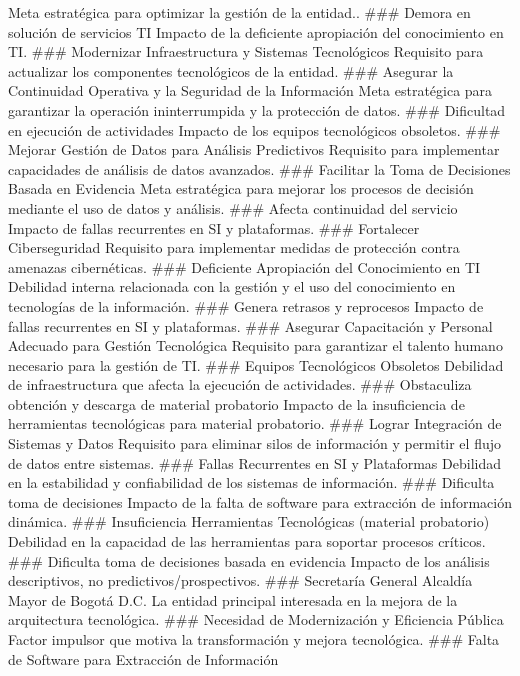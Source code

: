 \documentclass[
	a4paper, %
	12pt, %
]{include/CSSullivanBusinessReport}
\begin{document}
Meta estratégica para optimizar la gestión de la entidad.. \#\#\# Demora
en solución de servicios TI Impacto de la deficiente apropiación del
conocimiento en TI. \#\#\# Modernizar Infraestructura y Sistemas
Tecnológicos Requisito para actualizar los componentes tecnológicos de
la entidad. \#\#\# Asegurar la Continuidad Operativa y la Seguridad de
la Información Meta estratégica para garantizar la operación
ininterrumpida y la protección de datos. \#\#\# Dificultad en ejecución
de actividades Impacto de los equipos tecnológicos obsoletos. \#\#\#
Mejorar Gestión de Datos para Análisis Predictivos Requisito para
implementar capacidades de análisis de datos avanzados. \#\#\# Facilitar
la Toma de Decisiones Basada en Evidencia Meta estratégica para mejorar
los procesos de decisión mediante el uso de datos y análisis. \#\#\#
Afecta continuidad del servicio Impacto de fallas recurrentes en SI y
plataformas. \#\#\# Fortalecer Ciberseguridad Requisito para implementar
medidas de protección contra amenazas cibernéticas. \#\#\# Deficiente
Apropiación del Conocimiento en TI Debilidad interna relacionada con la
gestión y el uso del conocimiento en tecnologías de la información.
\#\#\# Genera retrasos y reprocesos Impacto de fallas recurrentes en SI
y plataformas. \#\#\# Asegurar Capacitación y Personal Adecuado para
Gestión Tecnológica Requisito para garantizar el talento humano
necesario para la gestión de TI. \#\#\# Equipos Tecnológicos Obsoletos
Debilidad de infraestructura que afecta la ejecución de actividades.
\#\#\# Obstaculiza obtención y descarga de material probatorio Impacto
de la insuficiencia de herramientas tecnológicas para material
probatorio. \#\#\# Lograr Integración de Sistemas y Datos Requisito para
eliminar silos de información y permitir el flujo de datos entre
sistemas. \#\#\# Fallas Recurrentes en SI y Plataformas Debilidad en la
estabilidad y confiabilidad de los sistemas de información. \#\#\#
Dificulta toma de decisiones Impacto de la falta de software para
extracción de información dinámica. \#\#\# Insuficiencia Herramientas
Tecnológicas (material probatorio) Debilidad en la capacidad de las
herramientas para soportar procesos críticos. \#\#\# Dificulta toma de
decisiones basada en evidencia Impacto de los análisis descriptivos, no
predictivos/prospectivos. \#\#\# Secretaría General Alcaldía Mayor de
Bogotá D.C. La entidad principal interesada en la mejora de la
arquitectura tecnológica. \#\#\# Necesidad de Modernización y Eficiencia
Pública Factor impulsor que motiva la transformación y mejora
tecnológica. \#\#\# Falta de Software para Extracción de Información
\end{document}
